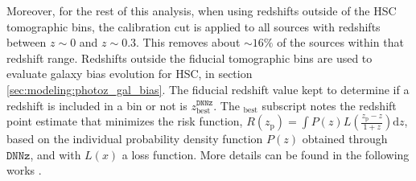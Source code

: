 Moreover, for the rest of this analysis, when using redshifts outside of the HSC tomographic bins, the calibration cut is applied to all sources with redshifts between $z\sim0$ and $z\sim0.3$. This removes about $\sim16\%$ of the sources within that redshift range. Redshifts outside the fiducial tomographic bins are used to evaluate galaxy bias evolution for HSC, in section \ref{sec:modeling:photoz_gal_bias}. The fiducial redshift value kept to determine if a redshift is included in a bin or not is $z_{\mathrm{best}}^{\texttt{DNNz}}$. The $_\mathrm{best}$ subscript notes the redshift point estimate that minimizes the risk function, $R(z_{\mathrm{p}})=\int P(z)L(\frac{z_{\mathrm{p}}-z}{1+z})\mathrm{d}z$, based on the individual probability density function $P(z)$ obtained through $\texttt{DNNz}$, and with $L(x)$ a loss function. More details can be found in the following works \cite{HSCPHotozTanaka2017, DNNZHSCNishizawa2020}. 
